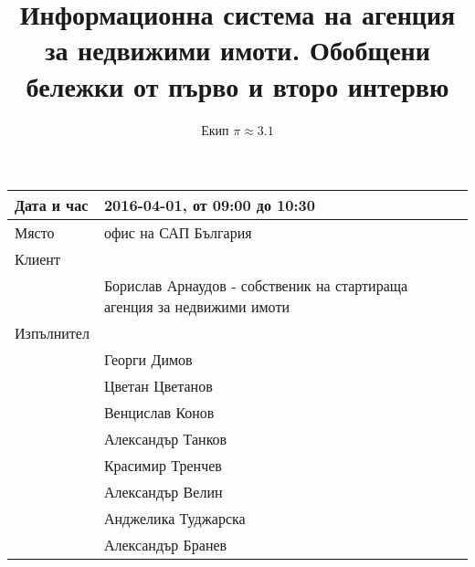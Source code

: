 \documentclass[]{article}
\begin{document}
\title{Информационна система на агенция за недвижими имоти. Обобщени бележки от първо и второ интервю}
\author{Екип $\pi \approx 3.1$}

\maketitle

\begin{center}

\begin{tabular}{|l|l|}
\hline
Дата и час	& 2016-04-01, от 09:00 до 10:30 \\ \hline
Място		& офис на САП България \\ \hline
Клиент		&  \\ \hline
			& Борислав Арнаудов - собственик на стартираща агенция за недвижими имоти \\ \hline
Изпълнител	&  \\ \hline
			& Георги Димов \\ \hline
			& Цветан Цветанов \\ \hline
			& Венцислав Конов \\ \hline
			& Александър Танков \\ \hline
			& Красимир Тренчев \\ \hline
			& Александър Велин \\ \hline
			& Анджелика Туджарска \\ \hline
			& Александър Бранев \\ \hline
\end{tabular}

\end{center}
\end{document}
